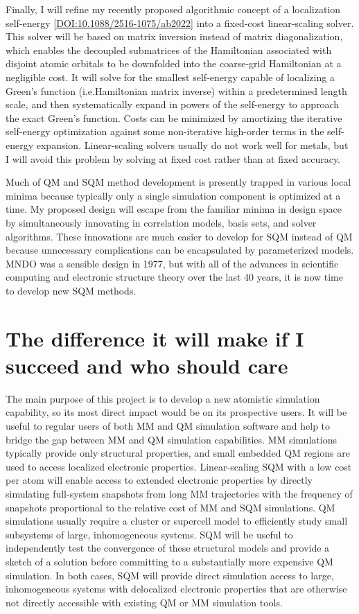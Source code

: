 \documentclass[12pt]{article}
\begin{document}
Finally, I will refine my recently proposed algorithmic concept of a localization self-energy [\href{https://doi.org/10.1088/2516-1075/ab2022}{DOI:10.1088/2516-1075/ab2022}]
 into a fixed-cost linear-scaling solver.
This solver will be based on matrix inversion instead of matrix diagonalization,
 which enables the decoupled submatrices of the Hamiltonian associated with disjoint atomic orbitals to be downfolded into
 the coarse-grid Hamiltonian at a negligible cost.
It will solve for the smallest self-energy capable of localizing a Green's function (i.e.\@ Hamiltonian matrix inverse)
 within a predetermined length scale, and then systematically expand in powers of the self-energy to approach the exact Green's function.
Costs can be minimized by amortizing the iterative self-energy optimization against some non-iterative high-order terms in the self-energy expansion.
Linear-scaling solvers usually do not work well for metals,
 but I will avoid this problem by solving at fixed cost rather than at fixed accuracy.

Much of QM and SQM method development is presently trapped in various local minima because typically only a single simulation component is optimized at a time.
My proposed design will escape from the familiar minima in design space by simultaneously innovating in correlation models, basis sets, and solver algorithms.
These innovations are much easier to develop for SQM instead of QM because unnecessary complications can be encapsulated by parameterized models.
MNDO was a sensible design in 1977, but with all of the advances in scientific computing and electronic structure theory over the last 40 years,
 it is now time to develop new SQM methods.

\section{The difference it will make if I succeed and who should care}

The main purpose of this project is to develop a new atomistic simulation capability,
 so its most direct impact would be on its prospective users.
It will be useful to regular users of both MM and QM simulation software
 and help to bridge the gap between MM and QM simulation capabilities.
 MM simulations typically provide only structural properties, and small embedded QM regions are used to access localized electronic properties.
Linear-scaling SQM with a low cost per atom will enable access to extended electronic properties by directly simulating full-system snapshots from long MM trajectories
 with the frequency of snapshots proportional to the relative cost of MM and SQM simulations.
QM simulations usually require a cluster or supercell model to efficiently study small subsystems of large, inhomogeneous systems.
SQM will be useful to independently test the convergence of these structural models and provide a sketch of a solution before committing to a substantially more expensive QM simulation.
In both cases, SQM will provide direct simulation access to large, inhomogeneous systems with delocalized electronic properties
 that are otherwise not directly accessible with existing QM or MM simulation tools.
\end{document}
